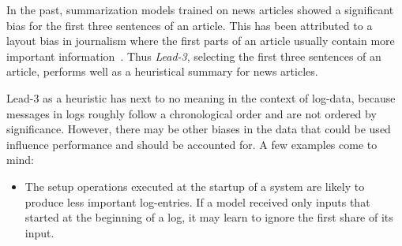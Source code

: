 In the past, summarization models trained on news articles showed a significant bias for the first three sentences of an article.
This has been attributed to a layout bias in journalism where the first parts of an article usually contain more important information~\parencite[544-546]{summarization_critical_evaluation}.
Thus \emph{Lead-3}, selecting the first three sentences of an article, performs well as a heuristical summary for news articles.

Lead-3 as a heuristic has next to no meaning in the context of log-data,
because messages in logs roughly follow a chronological order and are not ordered by significance.
However, there may be other biases in the data that could be used influence performance and should be accounted for.
A few examples come to mind:
\begin{itemize}
\item The setup operations executed at the startup of a system are likely to produce less important log-entries.
      If a model received only inputs that started at the beginning of a log,
      it may learn to ignore the first share of its input.


\end{itemize}
